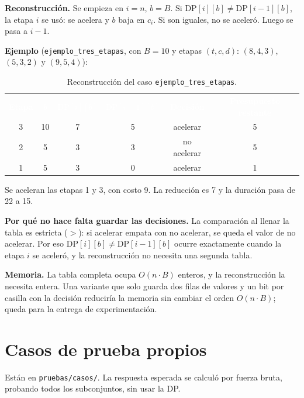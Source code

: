 \documentclass[11pt,a4paper]{article}
\newcommand{\cod}[1]{\texttt{#1}}
\newcommand{\DP}[2]{\mathrm{DP}[#1][#2]}
\newcommand{\encabezado}{\rowcolor{fondo}}
\newcommand{\blanco}[1]{\textcolor{white}{\textbf{#1}}}
\begin{document}
\textbf{Reconstrucción.} Se empieza en $i=n$, $b=B$. Si $\DP{i}{b}\ne\DP{i-1}{b}$, la etapa $i$ se usó: se acelera y $b$ baja en $c_i$. Si son iguales, no se aceleró. Luego se pasa a $i-1$.

\textbf{Ejemplo} (\cod{ejemplo\_tres\_etapas}, con $B=10$ y etapas $(t,c,d)$: $(8,4,3)$, $(5,3,2)$ y $(9,5,4)$):

\begin{table}[H]
\centering\small
\renewcommand{\arraystretch}{1.15}
\begin{tabular}{cccccc}
\encabezado \blanco{Etapa} & \blanco{$b$} & \blanco{$\DP{i}{b}$} & \blanco{$\DP{i-1}{b}$} & \blanco{Decisión} & \blanco{Presupuesto restante} \\
3 & 10 & 7 & 5 & acelerar & 5 \\
2 & 5 & 3 & 3 & no acelerar & 5 \\
1 & 5 & 3 & 0 & acelerar & 1 \\
\bottomrule
\end{tabular}
\caption{Reconstrucción del caso \cod{ejemplo\_tres\_etapas}.}
\end{table}

Se aceleran las etapas 1 y 3, con costo 9. La reducción es 7 y la duración pasa de 22 a 15.

\textbf{Por qué no hace falta guardar las decisiones.} La comparación al llenar la tabla es estricta ($>$): si acelerar empata con no acelerar, se queda el valor de no acelerar. Por eso $\DP{i}{b}\ne\DP{i-1}{b}$ ocurre exactamente cuando la etapa $i$ se aceleró, y la reconstrucción no necesita una segunda tabla.

\textbf{Memoria.} La tabla completa ocupa $O(n\cdot B)$ enteros, y la reconstrucción la necesita entera. Una variante que solo guarda dos filas de valores y un bit por casilla con la decisión reduciría la memoria sin cambiar el orden $O(n\cdot B)$; queda para la entrega de experimentación.

\section{Casos de prueba propios}
\label{sec:casos}

Están en \cod{pruebas/casos/}. La respuesta esperada se calculó por fuerza bruta, probando todos los subconjuntos, sin usar la DP.
\end{document}
